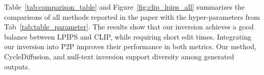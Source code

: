 
Table~\ref{tab:comparison_table} and Figure~\ref{fig:clip_lpips_all} summarizes the comparisons of all methods reported in the paper with the hyper-parameters from Tab~\ref{tab:table_parameter}. The results show that our inversion achieves a good balance between LPIPS and CLIP, while requiring short edit times. Integrating our inversion into P2P improves their performance in both metrics. Our method, CycleDiffusion, and null-text inversion support diversity among generated outputs.

